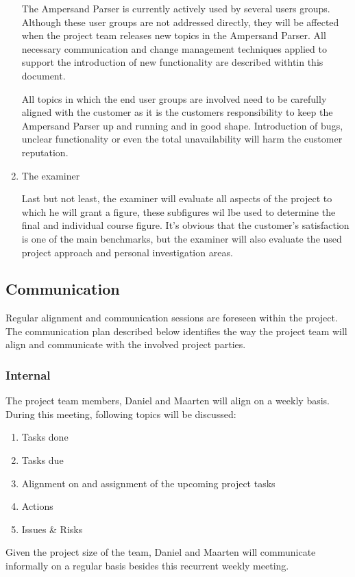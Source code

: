 \begin{enumerate}
The Ampersand Parser is currently actively used by several users groups. Although these user groups are not addressed directly, they will be affected when the project team releases new topics in the Ampersand Parser. All necessary communication and change management techniques applied to support the introduction of new functionality are described withtin this document.

All topics in which the end user groups are involved need to be carefully aligned with the customer as it is the customers responsibility to keep the Ampersand Parser up and running and in good shape. Introduction of bugs, unclear functionality or even the total unavailability will harm the customer reputation.

	\item The examiner

	Last but not least, the examiner will evaluate all aspects of the project to which he will grant a figure, these subfigures wil lbe used to determine the final and individual course figure. It's obvious that the customer's satisfaction is one of the main benchmarks, but the examiner will also evaluate the used project approach and personal investigation areas.

\end {enumerate}


\subsection{Communication}
Regular alignment and communication sessions are foreseen within the project. The communication plan described below identifies the way the project team will align and communicate with the involved project parties.

\subsubsection{Internal}
The project team members, Daniel and Maarten will align on a weekly basis.
During this meeting, following topics will be discussed:
\begin{enumerate}
	\item Tasks done
	\item Tasks due
	\item Alignment on and assignment of the upcoming project tasks
	\item Actions
	\item Issues \& Risks
\end {enumerate}
Given the project size of the team, Daniel and Maarten will communicate informally on a regular basis besides this recurrent weekly meeting.

